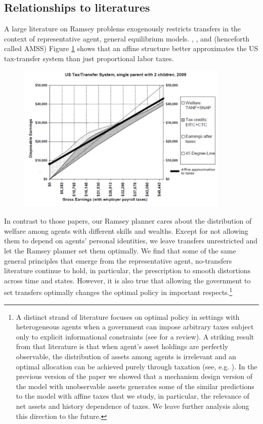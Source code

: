 \documentclass[thmsb,11pt]{article}
\begin{document}
\subsection{Relationships to literatures}
 A large  literature on Ramsey problems  exogenously restricts transfers in the context of representative agent, general equilibrium models.
  \citet{LucasJr.1983}, \citet{Chari1994},  and \citet{Aiyagari2002} (henceforth called  AMSS)
 Figure \ref{fig:affine_taxes} shows that an affine structure better approximates the US tax-transfer system than just proportional labor taxes. {
  \begin{figure}
    \centering
    \includegraphics[width = 0.9\textwidth]{affine_taxes.pdf}
    \label{fig:affine_taxes}
  \end{figure}

}
In contrast to those papers, our Ramsey planner cares about the distribution of welfare among
agents with different skills and wealths. Except for  not allowing them to depend
on agents' personal identities, we leave   transfers unrestricted and let  the Ramsey planner set
them optimally. We find that  some of the same general principles that emerge from the
representative agent, no-transfers literature continue to hold, in particular, the prescription to
smooth distortions across time and states.  However, it is also true that
allowing the government to set transfers optimally changes
the optimal policy in important
respects.\footnote{A distinct strand of literature focuses on  optimal policy in settings with
heterogeneous agents when a government can impose arbitrary taxes subject only
to explicit informational constraints (see \citet{golosov2007new} for a review). A striking result from that literature
is that when  agent's asset holdings are perfectly observable, the distribution of assets among
agents is irrelevant and an optimal allocation can be achieved purely through
taxation (see, e.g. \citet{Bassetto2004}).  In the previous version of the paper we showed that a mechanism design version of the model with unobservable assets generates some of the similar predictions to the model with affine taxes that we study, in particular, the relevance of net assets and history dependence of taxes. We leave further analysis along this
direction to the  future.}
\end{document}

